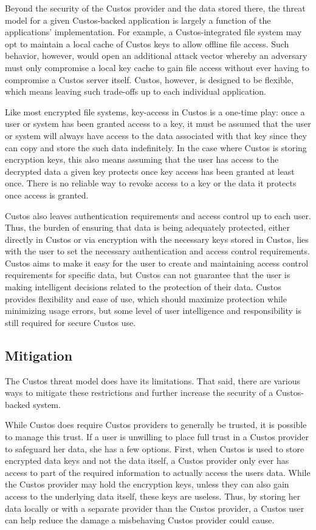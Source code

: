 Beyond the security of the Custos provider and the data stored there,
the threat model for a given Custos-backed application is largely a
function of the applications' implementation. For example, a
Custos-integrated file system may opt to maintain a local cache of
Custos keys to allow offline file access. Such behavior, however,
would open an additional attack vector whereby an adversary must only
compromise a local key cache to gain file access without ever having
to compromise a Custos server itself. Custos, however, is designed to
be flexible, which means leaving such trade-offs up to each individual
application.

Like most encrypted file systems, key-access in Custos is a one-time
play: once a user or system has been granted access to a key, it must
be assumed that the user or system will always have access to the data
associated with that key since they can copy and store the such data
indefinitely. In the case where Custos is storing encryption keys,
this also means assuming that the user has access to the decrypted
data a given key protects once key access has been granted at least
once. There is no reliable way to revoke access to a key or the data
it protects once access is granted.

Custos also leaves authentication requirements and access control up
to each user. Thus, the burden of ensuring that data is being
adequately protected, either directly in Custos or via encryption with
the necessary keys stored in Custos, lies with the user to set the
necessary authentication and access control requirements. Custos aims
to make it easy for the user to create and maintaining access control
requirements for specific data, but Custos can not guarantee that the
user is making intelligent decisions related to the protection of
their data. Custos provides flexibility and ease of use, which should
maximize protection while minimizing usage errors, but some level of
user intelligence and responsibility is still required for secure
Custos use.

\subsection{Mitigation}

The Custos threat model does have its limitations. That said, there
are various ways to mitigate these restrictions and further increase
the security of a Custos-backed system.

While Custos does require Custos providers to generally be trusted, it
is possible to manage this trust. If a user is unwilling to place full
trust in a Custos provider to safeguard her data, she has a few
options. First, when Custos is used to store encrypted data keys and
not the data itself, a Custos provider only ever has access to part of
the required information to actually access the users data. While the
Custos provider may hold the encryption keys, unless they can also
gain access to the underlying data itself, these keys are
useless. Thus, by storing her data locally or with a separate provider
than the Custos provider, a Custos user can help reduce the damage a
misbehaving Custos provider could cause.

